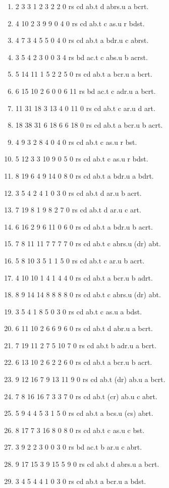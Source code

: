\documentclass[10pt,journal]{IEEEtran}
\begin{document}
\begin{enumerate}
\item 2 3 3 1 2 3 2 2 0 rs cd ab.t d abrs.u a bcrt.
\item 4 10 2 3 9 9 0 4 0 rs cd ab.t c as.u r bdst.
\item 4 7 3 4 5 5 0 4 0 rs cd ab.t a bdr.u c abrst.
\item 3 5 4 2 3 0 0 3 4 rs bd ac.t c abs.u b acrst.
\item 5 14 11 1 5 2 2 5 0 rs cd ab.t a bcr.u a bcrt.
\item 6 15 10 2 6 0 0 6 11 rs bd ac.t c adr.u a bcrt.
\item 11 31 18 3 13 4 0 11 0 rs cd ab.t c ar.u d art.
\item 18 38 31 6 18 6 6 18 0 rs cd ab.t a bcr.u b acrt.
\item 4 9 3 2 8 4 0 4 0 rs cd ab.t c as.u r bst.
\item 5 12 3 3 10 9 0 5 0 rs cd ab.t c as.u r bdst.
\item 8 19 6 4 9 14 0 8 0 rs cd ab.t a bdr.u a bdrt.
\item 3 5 4 2 4 1 0 3 0 rs cd ab.t d ar.u b acrt.
\item 7 19 8 1 9 8 2 7 0 rs cd ab.t d ar.u c art.
\item 6 16 2 9 6 11 0 6 0 rs cd ab.t a bdr.u b acrt.
\item 7 8 11 11 7 7 7 7 0 rs cd ab.t c abrs.u (dr) abt.
\item 5 8 10 3 5 1 1 5 0 rs cd ab.t c ar.u b acrt.
\item 4 10 10 1 4 1 4 4 0 rs cd ab.t a bcr.u b adrt.
\item 8 9 14 14 8 8 8 8 0 rs cd ab.t c abrs.u (dr) abt.
\item 3 5 4 1 8 5 0 3 0 rs cd ab.t c as.u a bdst.
\item 6 11 10 2 6 6 9 6 0 rs cd ab.t d abr.u a bcrt.
\item 7 19 11 2 7 5 10 7 0 rs cd ab.t b adr.u a bcrt.
\item 6 13 10 2 6 2 2 6 0 rs cd ab.t a bcr.u b acrt.
\item 9 12 16 7 9 13 11 9 0 rs cd ab.t (dr) ab.u a bcrt.
\item 7 8 16 16 7 3 3 7 0 rs cd ab.t (cr) ab.u c abrt.
\item 5 9 4 4 5 3 1 5 0 rs cd ab.t a bcs.u (cs) abrt.
\item 8 17 7 3 16 8 0 8 0 rs cd ab.t c as.u c bst.
\item 3 9 2 2 3 0 0 3 0 rs bd ac.t b ar.u c abrt.
\item 9 17 15 3 9 15 5 9 0 rs cd ab.t d abrs.u a bcrt.
\item 3 4 5 4 4 1 0 3 0 rs cd ab.t a bcr.u a bdst.

\end{enumerate}
\end{document}
